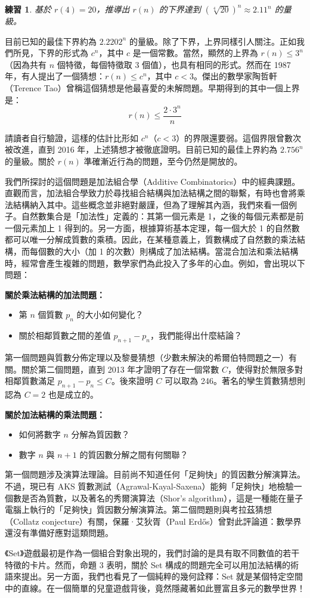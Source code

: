 \documentclass[12pt, a4paper]{article}
\newtheorem{exercise}{練習}
\begin{document}
\begin{exercise}
基於 $r(4)=20$，推導出 $r(n)$ 的下界達到 $(\sqrt[4]{20})^{n}\approx2.11^{n}$ 的量級。
\end{exercise}

目前已知的最佳下界約為 $2.2202^{n}$ 的量級。除了下界，上界同樣引人關注。正如我們所見，下界的形式為 $c^{n}$，其中 $c$ 是一個常數。當然，顯然的上界為 $r(n)\le3^{n}$（因為共有 $n$ 個特徵，每個特徵取 3 個值），也具有相同的形式。然而在 1987 年，有人提出了一個猜想：$r(n)\le c^{n}$，其中 $c<3$。傑出的數學家陶哲軒（Terence Tao）曾稱這個猜想是他最喜愛的未解問題。早期得到的其中一個上界是：
$$r(n)\le\frac{2\cdot3^{n}}{n}$$

請讀者自行驗證，這樣的估計比形如 $c^{n}$（$c<3$）的界限還要弱。這個界限曾數次被改進，直到 2016 年，上述猜想才被徹底證明。目前已知的最佳上界約為 $2.756^{n}$ 的量級。關於 $r(n)$ 準確漸近行為的問題，至今仍然是開放的。

我們所探討的這個問題是加法組合學（Additive Combinatorics）中的經典課題。直觀而言，加法組合學致力於尋找組合結構與加法結構之間的聯繫，有時也會將乘法結構納入其中。這些概念並非絕對嚴謹，但為了理解其內涵，我們來看一個例子。自然數集合是「加法性」定義的：其第一個元素是 1，之後的每個元素都是前一個元素加上 1 得到的。另一方面，根據算術基本定理，每一個大於 1 的自然數都可以唯一分解成質數的乘積。因此，在某種意義上，質數構成了自然數的乘法結構，而每個數的大小（加 1 的次數）則構成了加法結構。當混合加法和乘法結構時，經常會產生複雜的問題，數學家們為此投入了多年的心血。例如，會出現以下問題：

\textbf{關於乘法結構的加法問題：}
\begin{itemize}
    \item 第 $n$ 個質數 $p_{n}$ 的大小如何變化？
    \item 關於相鄰質數之間的差值 $p_{n+1}-p_{n}$，我們能得出什麼結論？
\end{itemize}
第一個問題與質數分佈定理以及黎曼猜想（少數未解決的希爾伯特問題之一）有關。關於第二個問題，直到 2013 年才證明了存在一個常數 $C$，使得對於無限多對相鄰質數滿足 $p_{n+1}-p_{n}\le C$。後來證明 $C$ 可以取為 246。著名的孿生質數猜想則認為 $C=2$ 也是成立的。

\textbf{關於加法結構的乘法問題：}
\begin{itemize}
    \item 如何將數字 $n$ 分解為質因數？
    \item 數字 $n$ 與 $n+1$ 的質因數分解之間有何關聯？
\end{itemize}
第一個問題涉及演算法理論。目前尚不知道任何「足夠快」的質因數分解演算法。不過，現已有 AKS 質數測試（Agrawal-Kayal-Saxena）能夠「足夠快」地檢驗一個數是否為質數，以及著名的秀爾演算法（Shor's algorithm），這是一種能在量子電腦上執行的「足夠快」質因數分解演算法。第二個問題則與考拉茲猜想（Collatz conjecture）有關，保羅·艾狄胥（Paul Erdős）曾對此評論道：數學界還沒有準備好應對這類問題。

《Set》遊戲最初是作為一個組合對象出現的，我們討論的是具有取不同數值的若干特徵的卡片。然而，命題 3 表明，關於 Set 構成的問題完全可以用加法結構的術語來提出。另一方面，我們也看見了一個純粹的幾何詮釋：Set 就是某個特定空間中的直線。在一個簡單的兒童遊戲背後，竟然隱藏著如此豐富且多元的數學世界！
\end{document}
